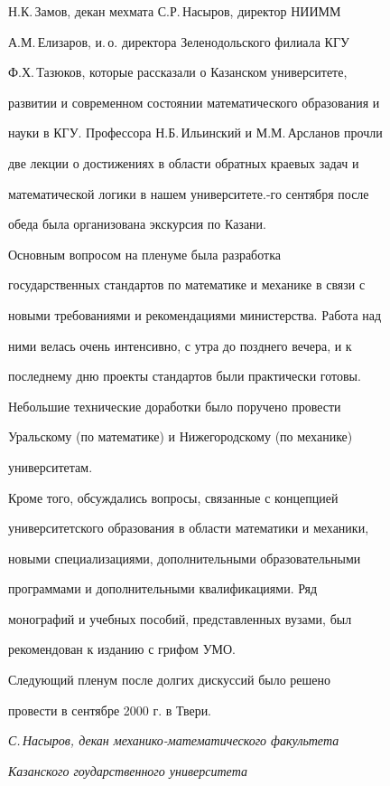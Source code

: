 Н.К.\,Замов, декан мехмата С.Р.\,На\-сы\-ров, директор НИИММ 


А.М.\,Елизаров, и.\,о. директора Зеленодольского филиала КГУ\linebreak


Ф.Х.\,Тазюков, которые рассказали о Казанском университете, 


развитии и современном состоянии математического образования и 


науки в КГУ. Профессора Н.Б.\,Ильинский и М.М.\,Арсланов прочли 


две лекции о достижениях в области обратных краевых задач и 


математической логики в нашем университете.-го сентября после 


обеда была организована экскурсия по Казани.





Основным вопросом на пленуме была разработка 


государственных стандартов по математике и механике в связи с 


новыми требованиями и рекомендациями министерства. Работа над 


ними велась очень интенсивно, с утра до позднего вечера, и к 


последнему дню проекты стандартов были практически готовы. 


Небольшие технические доработки было поручено провести 


Уральскому (по математике) и Нижегородскому (по механике) 


университетам.





Кроме того, обсуждались вопросы, связанные с концепцией 


университетского образования в области математики и механики, 


новыми специализациями, дополнительными образовательными 


программами и дополнительными квалификациями. Ряд 


монографий и учебных пособий, представленных вузами, был 


рекомендован к изданию с грифом УМО.





Следующий пленум после долгих дискуссий было решено 


провести в сентябре 2000 г. в Твери.


\bigskip





{\it С.\,Насыров, декан механико-математического факультета}





{\it Казанского гоударственного университета}














